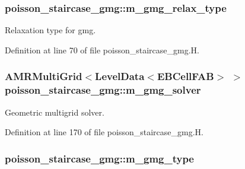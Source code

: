 \subsubsection[{\texorpdfstring{m\+\_\+gmg\+\_\+relax\+\_\+type}{m_gmg_relax_type}}]{ poisson\+\_\+staircase\+\_\+gmg\+::m\+\_\+gmg\+\_\+relax\+\_\+type\hspace{0.3cm}{\ttfamily [protected]}}\hypertarget{classpoisson__staircase__gmg_a7b9efb21f3dcd4a5919ad438899cfec4}{}\label{classpoisson__staircase__gmg_a7b9efb21f3dcd4a5919ad438899cfec4}


Relaxation type for gmg. 



Definition at line 70 of file poisson\+\_\+staircase\+\_\+gmg.\+H.

\subsubsection[{\texorpdfstring{m\+\_\+gmg\+\_\+solver}{m_gmg_solver}}]{\setlength{\rightskip}{0pt plus 5cm}A\+M\+R\+Multi\+Grid$<$Level\+Data$<$E\+B\+Cell\+F\+AB$>$ $>$ poisson\+\_\+staircase\+\_\+gmg\+::m\+\_\+gmg\+\_\+solver\hspace{0.3cm}{\ttfamily [protected]}}\hypertarget{classpoisson__staircase__gmg_a324f584aa293a111287561d4e0287cca}{}\label{classpoisson__staircase__gmg_a324f584aa293a111287561d4e0287cca}


Geometric multigrid solver. 



Definition at line 170 of file poisson\+\_\+staircase\+\_\+gmg.\+H.

\subsubsection[{\texorpdfstring{m\+\_\+gmg\+\_\+type}{m_gmg_type}}]{ poisson\+\_\+staircase\+\_\+gmg\+::m\+\_\+gmg\+\_\+type\hspace{0.3cm}{\ttfamily [protected]}}\hypertarget{classpoisson__staircase__gmg_a91d80909dcc02b14adc86a7df9bc89bd}{}\label{classpoisson__staircase__gmg_a91d80909dcc02b14adc86a7df9bc89bd}


